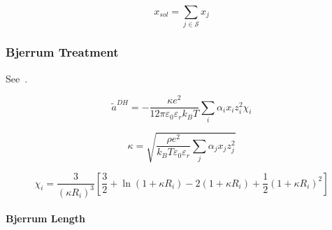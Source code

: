\documentclass[12pt, letterpaper]{article}
\begin{document}
\begin{equation}
    x_{sol}=\sum_{j\in\mathcal S}x_{j}
    \label{eq:x_solvent_total}
\end{equation}

\subsubsection{Bjerrum Treatment}

See~\cite{Bulow2021}.

\begin{equation}
    \tilde{a}^{DH}=-\frac{\kappa e^{2}}{12\pi\varepsilon_{0}\varepsilon_{r}k_{B}T}\sum_{i}\alpha_{i}x_{i}z_{i}^{2}\chi_{i}
    \label{eq:ares_dh_bjerrum}
\end{equation}


\begin{equation}
    \kappa=\sqrt{\frac{\rho e^{2}}{k_{B}T\varepsilon_{0}\varepsilon_{r}}\sum_{j}\alpha_{j}x_{j}z_{j}^{2}}
    \label{eq:kappa_dh_bjerrum}
\end{equation}


\begin{equation}
    \chi_{i}=\frac{3}{\left(\kappa R_{i}\right)^3}\left[\frac{3}{2}+\ln(1+\kappa R_{i})-2(1+\kappa R_{i})+\frac{1}{2}\left(1+\kappa R_{i}\right)^2\right]
    \label{eq:chi_dh_bjerrum}
\end{equation}

\paragraph{Bjerrum Length}
\end{document}
